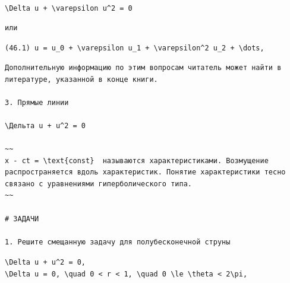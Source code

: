 \documentclass[
  ukrainian,
]{article}
\begin{document}
\texttt{\textbackslash{}Delta\ u\ +\ \textbackslash{}varepsilon\ u\^{}2\ =\ 0}

\begin{verbatim}
или
\end{verbatim}

\texttt{(46.1)\ u\ =\ u\_0\ +\ \textbackslash{}varepsilon\ u\_1\ +\ \textbackslash{}varepsilon\^{}2\ u\_2\ +\ \textbackslash{}dots,}

\begin{verbatim}
Дополнительную информацию по этим вопросам читатель может найти в литературе, указанной в конце книги.

3. Прямые линии

\Дельта u + u^2 = 0

~~
x - ct = \text{const}  называются характеристиками. Возмущение распространяется вдоль характеристик. Понятие характеристики тесно связано с уравнениями гиперболического типа.
~~

# ЗАДАЧИ

1. Решите смещанную задачу для полубесконечной струны
\end{verbatim}

\texttt{\textbackslash{}Delta\ u\ +\ u\^{}2\ =\ 0,}
\texttt{\textbackslash{}Delta\ u\ =\ 0,\ \textbackslash{}quad\ 0\ \textless{}\ r\ \textless{}\ 1,\ \textbackslash{}quad\ 0\ \textbackslash{}le\ \textbackslash{}theta\ \textless{}\ 2\textbackslash{}pi,}
\end{document}
